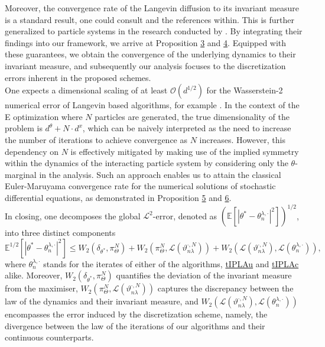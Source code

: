 \documentclass[a4paper, 10pt]{article}
\theoremstyle{plain}%
\begin{document}
\indent Moreover, the convergence rate of the Langevin diffusion to its invariant measure is a standard result, one  could consult \cite{Durmus2} and the references within. This is further generalized to particle systems in the research conducted by \cite{Ipla}. By integrating their findings into our framework, we arrive at Proposition \hyperlink{Prop3}{3} and \hyperlink{Prop7}{4}. Equipped with these guarantees, we obtain the convergence of the underlying dynamics to their invariant measure, and subsequently our analysis focuses to the discretization errors inherent in the proposed schemes.\\
\indent One expects a dimensional scaling of at least $\mathcal{O}(d^{1/2})$ for the Wasserstein-2 numerical error of Langevin based algorithms, for example \cite{Durmus1}. In the context of the E optimization where $N$ particles are generated, the true dimensionality of the problem is $d^{\theta}+N\cdot d^{x}$, which can be naively interpreted as the need to increase the number of iterations to achieve convergence as $N$ increases. However, this dependency on $N$ is effectively mitigated by making use of the implied symmetry within the dynamics of the interacting  particle system by considering only the $\theta$-marginal in the analysis. Such an approach enables us to attain the classical Euler-Maruyama convergence rate for the numerical solutions of stochastic differential equations, as demonstrated in Proposition \hyperlink{Prop5}{5} and \hyperlink{Prop6}{6}.\\
\indent In closing, one decomposes the global $\mathcal{L}^2$-error, denoted as $\left(\mathbb{E}\left[|{\theta}^{*}-{\theta}^{\lambda,\cdot}_n|^2\right]\right)^{1/2}$, into three distinct components $$\mathbb{E}^{1/2}\left[|{\theta}^{*}-{\theta}^{\lambda,\cdot}_n|^2\right]\leq W_2(\delta_{\theta^*},\pi_{\Theta}^N)+W_2(\pi_{\Theta}^N,\mathcal{L}(\vartheta^{\cdot,N}_{n\lambda}))+W_2(\mathcal{L}(\vartheta^{\cdot,N}_{n\lambda}),\mathcal{L}(\theta_n^{\lambda,\cdot})),$$ where ${\theta}^{\lambda,\cdot}_n$ stands for the iterates of either of the algorithms, \hyperref[algo1]{tIPLAu} and \hyperref[algo2]{tIPLAc} alike. Moreover, $W_2(\delta_{\theta^*},\pi_{\Theta}^N)$ quantifies the deviation of the invariant measure from the maximiser, $W_2(\pi_{\Theta}^N,\mathcal{L}(\vartheta^{\cdot,N}_{n\lambda}))$ captures the discrepancy between the law of the dynamics and their invariant measure, and $W_2(\mathcal{L}(\vartheta^{\cdot,N}_{n\lambda}),\mathcal{L}(\theta_n^{\lambda,\cdot}))$ encompasses the error induced by the discretization scheme, namely, the divergence between the law of the iterations of our algorithms and their continuous counterparts.
\end{document}
